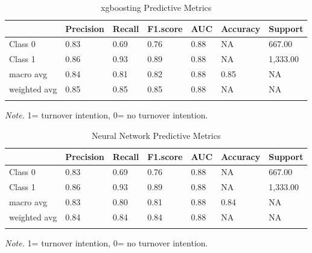 \documentclass[
  man]{apa7}
\begin{document}
\begin{table}[tbp]

\begin{center}
\begin{threeparttable}

\caption{\label{tab:xgbtable10k}xgboosting Predictive Metrics}

\begin{tabular}{lllllll}
\toprule
 & \multicolumn{1}{c}{Precision} & \multicolumn{1}{c}{Recall} & \multicolumn{1}{c}{F1.score} & \multicolumn{1}{c}{AUC} & \multicolumn{1}{c}{Accuracy} & \multicolumn{1}{c}{Support}\\
\midrule
Class 0 & 0.83 & 0.69 & 0.76 & 0.88 & NA & 667.00\\
Class 1 & 0.86 & 0.93 & 0.89 & 0.88 & NA & 1,333.00\\
macro avg & 0.84 & 0.81 & 0.82 & 0.88 & 0.85 & NA\\
weighted avg & 0.85 & 0.85 & 0.85 & 0.88 & NA & NA\\
\bottomrule
\addlinespace
\end{tabular}

\begin{tablenotes}[para]
\normalsize{\textit{Note.} 1= turnover intention, 0= no turnover intention.}
\end{tablenotes}

\end{threeparttable}
\end{center}

\end{table}

\begin{table}[tbp]

\begin{center}
\begin{threeparttable}

\caption{\label{tab:nn10k}Neural Network Predictive Metrics}

\begin{tabular}{lllllll}
\toprule
 & \multicolumn{1}{c}{Precision} & \multicolumn{1}{c}{Recall} & \multicolumn{1}{c}{F1.score} & \multicolumn{1}{c}{AUC} & \multicolumn{1}{c}{Accuracy} & \multicolumn{1}{c}{Support}\\
\midrule
Class 0 & 0.83 & 0.69 & 0.76 & 0.88 & NA & 667.00\\
Class 1 & 0.86 & 0.93 & 0.89 & 0.88 & NA & 1,333.00\\
macro avg & 0.83 & 0.80 & 0.81 & 0.88 & 0.84 & NA\\
weighted avg & 0.84 & 0.84 & 0.84 & 0.88 & NA & NA\\
\bottomrule
\addlinespace
\end{tabular}

\begin{tablenotes}[para]
\normalsize{\textit{Note.} 1= turnover intention, 0= no turnover intention.}
\end{tablenotes}

\end{threeparttable}
\end{center}

\end{table}
\end{document}
